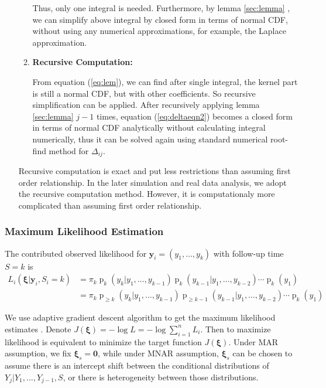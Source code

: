 \documentclass[12pt]{article}
\DeclareMathOperator{\pr}{p}
\begin{document}
\begin{itemize}
\begin{enumerate}
    Thus, only one integral is needed. Furthermore, by lemma
    \ref{sec:lemma} , we can simplify above integral by closed form in
    terms of normal CDF, without using any numerical approximations,
    for example, the Laplace approximation.


  \item \textbf{Recursive Computation: }

    From equation (\ref{eq:lem}), we can find after single integral,
    the kernel part is still a normal CDF, but with other
    coefficients. So recursive simplification can be applied. After
    recursively applying lemma \ref{sec:lemma} $j - 1$ times, equation
    (\ref{eq:deltaeqn2}) becomes a closed form in terms of normal CDF
    analytically without calculating integral numerically, thus it can
    be solved again using standard numerical root-find method for
    $\Delta_{ij}$.
  \end{enumerate}

  Recursive computation is exact and put less restrictions than
  assuming first order relationship. In the later simulation and real
  data analysis, we adopt the recursive computation method. However,
  it is computationaly more complicated than assuming first order
  relationship.

\end{itemize}

\subsubsection{Maximum Likelihood Estimation}
\label{sec:mle}

The contributed observed likelihood for $\bm y_i = (y_1, \ldots, y_k)$
with follow-up time $S = k$ is
\begin{align} \label{eq:ll}
  L_i(\bm \xi| \bm y_i, S_{i} = k) & = \pi_k\pr_k (y_k | y_1, \ldots, y_{k-1}) 
\pr_k (y_{k-1}|y_1, \ldots, y_{k-2}) \cdots \pr_{k} (y_1) \\
  & = \pi_k \pr_{\geq k} (y_k | y_1, \ldots, y_{k-1}) \pr_{\geq k-1}
  (y_{k-1}|y_1, \ldots, y_{k-2}) \cdots \pr_{k} (y_1) \nonumber
\end{align}

We use adaptive gradient descent algorithm to get the maximum
likelihood estimates \citet{ried1993}. Denote $J(\bm
\xi) = - \log L = - \log \sum_{i = 1}^n L_i$.  Then to maximize
likelihood is equivalent to minimize the target function $J(\bm
\xi)$. Under MAR assumption, we fix $\bm \xi_s = \bm 0$, while under
MNAR assumption, $\bm \xi_s $ can be chosen to assume there is an
intercept shift between the conditional distributions of $Y_{j}|
Y_{1}, \ldots, Y_{j-1}, S$, or there is heterogeneity between those
distributions.
\end{document}
